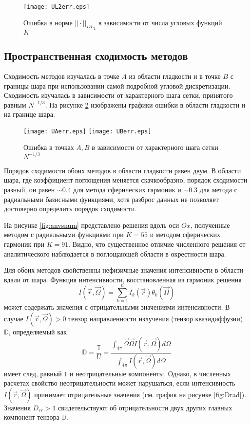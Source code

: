 \begin{figure}[ht!]
\centering
\texttt{[image: UL2err.eps]}
\caption{Ошибка в норме $||\cdot||_{DL_2}$ в зависимости от числа угловых функций $K$}
\label{fig:UL2err}
\end{figure}

\subsection{Пространственная сходимость методов}

Сходимость методов изучалась в точке $A$ из области гладкости и в точке $B$ с границы шара при использовании самой подробной угловой дискретизации. Сходимость изучалась в зависимости от характерного шага сетки, принятого равным $N^{-1/3}$. На рисунке \ref{fig:UAerr} изображены графики ошибки в области гладкости и на границе шара.

\begin{figure}[ht!]
\centering
\texttt{[image: UAerr.eps]}
\texttt{[image: UBerr.eps]}
\caption{Ошибка в точках $A, B$ в зависимости от характерного шага сетки $N^{-1/3}$}
\label{fig:UAerr}
\end{figure}

Порядок сходимости обоих методов в области гладкости равен двум. В области шара, где коэффициент поглощения меняется скачкообразно, порядок сходимости разный, он равен $\sim 0.4$ для метода сферических гармоник и $\sim 0.3$ для метода с радиальными базисными функциями, хотя разброс данных не позволяет достоверно определить порядок сходимости.

На рисунке \ref{fig:anvsnum} представлено решения вдоль оси $Ox$, полученные методом с радиальными функциями при $K = 55$ и методом сферических гармоник при $K = 91$. Видно, что существенное отличие численного решения от аналитического наблюдается в поглощающей области в окрестности шара.

Для обоих методов свойственны нефизичные значения интенсивности в области вдали от шара. Функция интенсивности, восстановленная из гармоник решения
\[
I(\vec r, \vec \Omega) = \sum_{k=1}^{n} I_k(\vec r) \theta_k (\vec \Omega)
\]
может содержать значения с отрицательными значениями интенсивности. В случае $I(\vec r, \vec \Omega) > 0$ тензор направленности излучения (тензор квазидиффузии) $\mathbb D$, определяемый как
\[
\mathbb D = \frac{\mathbb T}{U} = \frac{\int_{4\pi} \vec \Omega\vec \Omega I(\vec r, \vec \Omega) d\Omega}{\int_{4\pi} I(\vec r, \vec \Omega) d\Omega}
\]
имеет след, равный $1$ и неотрицательные компоненты. Однако, в численных расчетах свойство неотрицательности может нарушаться, если интенсивность $I(\vec r, \vec \Omega)$ принимает отрицательные значения (см. график на рисунке \ref{fig:Drad}). Значения $D_{rr} > 1$ свидетельствуют об отрицательности двух других главных компонент тензора $\mathbb D$.

